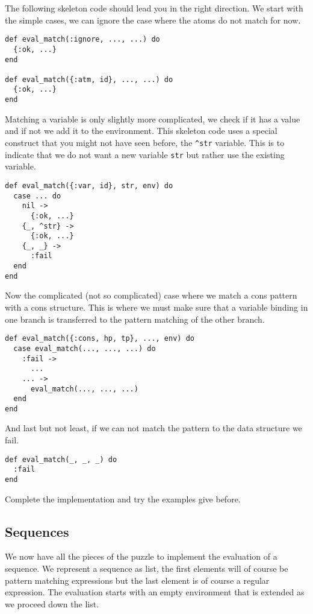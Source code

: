 \documentclass[a4paper,11pt]{article}
\begin{document}
The following skeleton code should lead you in the right direction. We
start with the simple cases, we can ignore the case where the atoms
do not match for now.

\begin{verbatim}
def eval_match(:ignore, ..., ...) do
  {:ok, ...}
end

def eval_match({:atm, id}, ..., ...) do
  {:ok, ...}
end
\end{verbatim}

Matching a variable is only slightly more complicated, we check if it
has a value and if not we add it to the environment. This skeleton
code uses a special construct that you might not have seen before, the
{\tt \^{}str} variable. This is to indicate that we do not want a new
variable {\tt str} but rather use the existing variable.

\pagebreak

\begin{verbatim}
def eval_match({:var, id}, str, env) do
  case ... do
    nil ->
      {:ok, ...}
    {_, ^str} ->
      {:ok, ...}
    {_, _} ->
      :fail
  end
end
\end{verbatim}

Now the complicated (not so complicated) case where we match a cons
pattern with a cons structure. This is where we must make sure that a
variable binding in one branch is transferred to the pattern matching
of the other branch.

\begin{verbatim}
def eval_match({:cons, hp, tp}, ..., env) do
  case eval_match(..., ..., ...) do
    :fail ->
      ...
    ... ->
      eval_match(..., ..., ...)
  end
end
\end{verbatim}

And last but not least, if we can not match the pattern to the data
structure we fail.

\begin{verbatim}
def eval_match(_, _, _) do
  :fail
end
\end{verbatim}

Complete the implementation and try the examples give before.

\subsection{Sequences}

We now have all the pieces of the puzzle to implement the evaluation
of a sequence. We represent a sequence as list, the first elements
will of course be pattern matching expressions but the last element is
of course a regular expression. The evaluation starts with an empty
environment that is extended as we proceed down the list.
\end{document}
